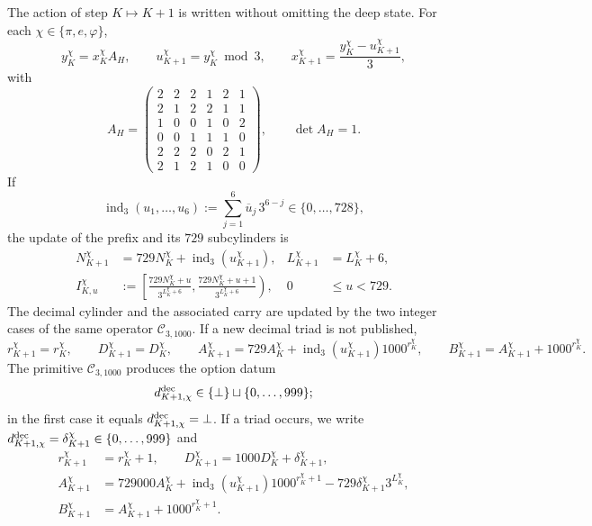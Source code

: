 The action of step \(K\mapsto K+1\) is written without omitting the deep state.
For each \(\chi\in\{\pi,e,\varphi\}\),
\begin{equation}
\label{eq:continuo-comun-update-hensel-tpk}
 y_K^\chi=x_K^\chi A_H,\qquad
 u_{K+1}^\chi=y_K^\chi\bmod3,\qquad
 x_{K+1}^\chi=\frac{y_K^\chi-u_{K+1}^\chi}{3},
\end{equation}
with
\[
 A_H=
 \begin{pmatrix}
 2&2&2&1&2&1\\
 2&1&2&2&1&1\\
 1&0&0&1&0&2\\
 0&0&1&1&1&0\\
 2&2&2&0&2&1\\
 2&1&2&1&0&0
 \end{pmatrix},
 \qquad \det A_H=1.
\]
If
\[
 \operatorname{ind}_3(u_1,\ldots,u_6)
 :=\sum_{j=1}^{6}\overline u_j\,3^{6-j}
 \in\{0,\ldots,728\},
\]
the update of the prefix and its \(729\) subcylinders is
\begin{align}
 N_{K+1}^\chi
 &=729N_K^\chi+\operatorname{ind}_3(u_{K+1}^\chi),
 &L_{K+1}^\chi&=L_K^\chi+6,
 \label{eq:continuo-comun-update-cilindro-indice}\\
 I_{K,u}^\chi
 &:=
 \left[
  \frac{729N_K^\chi+u}{3^{L_K^\chi+6}},
  \frac{729N_K^\chi+u+1}{3^{L_K^\chi+6}}
 \right),
 &0&\leq u<729.
 \label{eq:continuo-comun-update-cilindro-intervalo}
\end{align}
The decimal cylinder and the associated carry are updated by the two integer
cases of the same operator \(\mathcal C_{3,1000}\). If a new decimal triad is not
published,
\begin{equation}
\label{eq:continuo-comun-update-cilindro-sin-triada}
 r_{K+1}^\chi=r_K^\chi,\qquad D_{K+1}^\chi=D_K^\chi,\qquad
 A_{K+1}^\chi=729A_K^\chi+
 \operatorname{ind}_3(u_{K+1}^\chi)1000^{r_K^\chi},\qquad
 B_{K+1}^\chi=A_{K+1}^\chi+1000^{r_K^\chi}.
\end{equation}
The primitive \(\mathcal C_{3,1000}\) produces the option datum
\[
 d_{K+1,\chi}^{\rm dec}\in
 \{\bot\}\sqcup\{0,\ldots,999\};
\]
in the first case it equals \(d_{K+1,\chi}^{\rm dec}=\bot\). If a triad occurs, we write
\(d_{K+1,\chi}^{\rm dec}=\delta_{K+1}^\chi\in\{0,\ldots,999\}\) and
\begin{equation}
\label{eq:continuo-comun-update-cilindro-con-triada}
 \begin{aligned}
 r_{K+1}^\chi&=r_K^\chi+1,\qquad
 D_{K+1}^\chi=1000D_K^\chi+\delta_{K+1}^\chi,\\
 A_{K+1}^\chi&=729000A_K^\chi
 +\operatorname{ind}_3(u_{K+1}^\chi)1000^{r_K^\chi+1}
 -729\delta_{K+1}^\chi3^{L_K^\chi},\\
 B_{K+1}^\chi&=A_{K+1}^\chi+1000^{r_K^\chi+1}.
 \end{aligned}
\end{equation}
